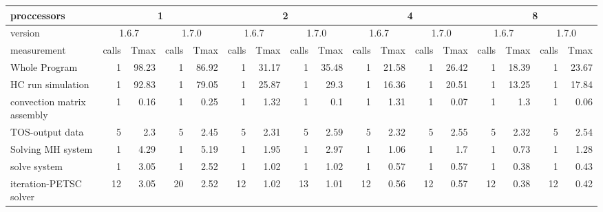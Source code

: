 \begin{sidewaystable}[!htbp]
\scriptsize
\begin{tabular}{|l|r|r|r|r|r|r|r|r|r|r|r|r|r|r|r|r|}
\hline
proccessors                            & \multicolumn{4}{c|}{1} & \multicolumn{4}{c|}{2} & \multicolumn{4}{c|}{4} & \multicolumn{4}{c|}{8} \\
\hline
version                                & \multicolumn{2}{c|}{1.6.7} & \multicolumn{2}{c|}{1.7.0} &  \multicolumn{2}{c|}{1.6.7} & \multicolumn{2}{c|}{1.7.0} &   \multicolumn{2}{c|}{1.6.7} & \multicolumn{2}{c|}{1.7.0} & \multicolumn{2}{c|}{1.6.7} & \multicolumn{2}{c|}{1.7.0}  \\
\hline
measurement                            & calls &  Tmax  & calls  &  Tmax  & calls  &  Tmax  & calls  &  Tmax  & calls  &  Tmax  & calls  &  Tmax  & calls  &  Tmax  & calls  &  Tmax  \\
\hline
Whole Program                          &   1   &   98.23   &   1   &   86.92   &   1   &   31.17   &   1   &   35.48   &   1   &   21.58   &   1   &   26.42   &   1   &   18.39   &   1   &   23.67   \\
 HC run simulation                     &   1   &   92.83   &   1   &   79.05   &   1   &   25.87   &   1   &   29.3    &   1   &   16.36   &   1   &   20.51   &   1   &   13.25   &   1   &   17.84   \\
\rowcolor{GreenYellow} 
  convection matrix assembly           &   1   &   0.16    &   1   &   0.25    &   1   &   1.32    &   1   &   0.1 &   1   &   1.31    &   1   &   0.07    &   1   &   1.3 &   1   &   0.06    \\
\rowcolor{GreenYellow}
  TOS-output data                      &   5   &   2.3 &   5   &   2.45    &   5   &   2.31    &   5   &   2.59    &   5   &   2.32    &   5   &   2.55    &   5   &   2.32    &   5   &   2.54    \\
\rowcolor{GreenYellow}
  Solving MH system                    &   1   &   4.29    &   1   &   5.19    &   1   &   1.95    &   1   &   2.97    &   1   &   1.06    &   1   &   1.7 &   1   &   0.73    &   1   &   1.28    \\
   solve system                      &   1   &   3.05    &   1   &   2.52    &   1   &   1.02    &   1   &   1.02    &   1   &   0.57    &   1   &   0.57    &   1   &   0.38    &   1   &   0.43    \\
    iteration-PETSC solver         &   12  &   3.05    &   20  &   2.52    &   12  &   1.02    &   13  &   1.01    &   12  &   0.56    &   12  &   0.57    &   12  &   0.38    &   12  &   0.42    \\

\end{tabular}
\end{sidewaystable}
